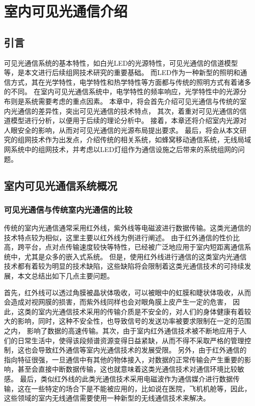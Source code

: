
\chapter{室内可见光通信介绍}\label{chap:VLC-system}
\section{引言}
可见光通信系统的基本特性，如白光LED的光源特性，可见光通信的信道模型等，是本文进行后续组网技术研究的重要基础。
而LED作为一种新型的照明和通信方式，其在光学特性，电学特性和热学特性等方面都与传统的照明方式有着诸多的不同。
在室内可见光通信系统中，电学特性的频率响应，光学特性中的光源分布则是系统需要考虑的重点因素。
本章中，将会首先介绍可见光通信与传统的室内光通信的差异性，突出可见光通信的技术特点，
其次，着重对可见光通信的信道模型进行分析，以便用于后续的理论分析中。
接着，本章还将介绍室内光源对人眼安全的影响，从而对可见光通信的光源布局提出要求。
最后，将会从本文研究的组网技术作为出发点，介绍传统的相关系统，如蜂窝移动通信系统，无线局域网系统中的组网技术，并考虑以LED灯组作为通信设施之后带来的系统组网的问题。

\section{室内可见光通信系统概况}\label{sec:VLC-background}
\subsection{可见光通信与传统室内光通信的比较}\label{sec:Visible-IR}
传统的室内光通信通常采用红外线，紫外线等电磁波进行数据传输。这类光通信的技术特点较为相似，这里主要以红外线为例进行阐述。
由于红外通信的性价比高，跨平台，点对点传输速度较快等特性，已经被广泛地应用于室内短距离通信系统中，尤其是众多的嵌入式系统。
但是，使用红外线进行通信的这类室内光通信技术都有着较为明显的技术缺陷，这些缺陷将会限制着这类光通信技术的可持续发展，本文总结出如下几点主要问题。

首先，红外线可以透过角膜被晶状体吸收，可以被眼中的虹膜和睫状体吸收，从而会造成对视网膜的损害\cite{SongZhengXun2008}，而紫外线同样也会对眼角膜上皮产生一定的危害，
因此，这类的室内光通信技术采用的传输介质是不安全的，对人们的身体健康有着较大的影响，同时，这种不安全性，也导致信号的发送功率被要求限制在一定的范围之内，
影响了数据的高速传输。其次，由于室内红外通信技术被不断地应用于人们的日常生活中，使得该段频谱资源变得日益紧缺，从而不得不采取严格的管理控制，这也会导致红外通信等室内光通信技术的发展受限。
另外，由于红外通信的指向特征很强，一旦通信中有其他的物体接入，对数据的正常传输会产生重要的影响，甚至会直接中断数据传输，这也就意味着这类光通信技术对通信环境比较敏感\cite{kahn1997}。
最后，类似红外线的此类光通信技术采用电磁波作为通信媒介进行数据传输，这在一些特定的场合下是不能被应用的，比如说在医院，飞机机舱等，因此，这些领域的室内无线通信需要使用一种新型的无线通信技术来解决。

